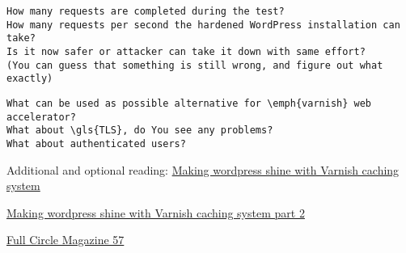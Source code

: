 \begin{Verbatim}[samepage=true,frame=single,
label=Discussion,framesep=2mm,rulecolor=\color{blue},commandchars=\\\{\}]
How many requests are completed during the test?
How many requests per second the hardened WordPress installation can take?
Is it now safer or attacker can take it down with same effort? 
(You can guess that something is still wrong, and figure out what exactly)
\end{Verbatim}


\begin{Verbatim}[samepage=true,frame=single,
label=Discussion,framesep=2mm,rulecolor=\color{blue},commandchars=\\\{\}]
What can be used as possible alternative for \emph{varnish} web accelerator?
What about \gls{TLS}, do You see any problems?
What about authenticated users?
\end{Verbatim}

Additional and optional reading:
\href{http://kaanon.com/blog/work/making-wordpress-shine-varnish-caching-system-part-1}{Making wordpress shine with Varnish caching system}

\href{http://kaanon.com/blog/varnish/making-wordpress-shine-varnish-caching-system-part-2}{Making wordpress shine with Varnish caching system part 2}

\href{http://www.google.com/producer/editions/CAowvZtX/full_circle_magazine_57_lite}
{Full Circle Magazine 57}

